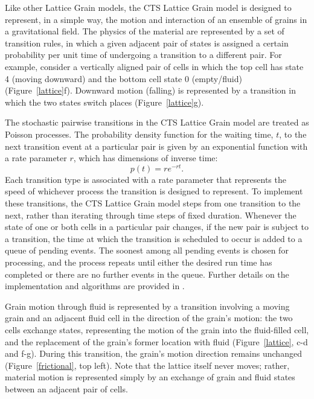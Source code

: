 \documentclass[esurf, manuscript]{copernicus}
\begin{document}
Like other Lattice Grain models, the CTS Lattice Grain model is designed to represent, in a simple way, the motion and interaction of an ensemble of grains in a gravitational field. The physics of the material are represented by a set of transition rules, in which a given adjacent pair of states is assigned a certain probability per unit time of undergoing a transition to a different pair. For example, consider a vertically aligned pair of cells in which the top cell has state 4 (moving downward) and the bottom cell state 0 (empty/fluid) (Figure~\ref{lattice}f). Downward motion (falling) is represented by a transition in which the two states switch places (Figure~\ref{lattice}g).

The stochastic pairwise transitions in the CTS Lattice Grain model are treated as Poisson processes. The probability density function for the waiting time, $t$, to the next transition event at a particular pair is given by an exponential function with a rate parameter $r$, which has dimensions of inverse time:
\begin{equation}
p(t) = r e^{-rt}.
\end{equation}
Each transition type is associated with a rate parameter that represents the speed of whichever process the transition is designed to represent. To implement these transitions, the CTS Lattice Grain model steps from one transition to the next, rather than iterating through time steps of fixed duration. Whenever the state of one or both cells in a particular pair changes, if the new pair is subject to a transition, the time at which the transition is scheduled to occur is added to a queue of pending events. The soonest among all pending events is chosen for processing, and the process repeats until either the desired run time has completed or there are no further events in the queue. Further details on the implementation and algorithms are provided in \citet{tucker2016celllab}.

Grain motion through fluid is represented by a transition involving a moving grain and an adjacent fluid cell in the direction of the grain's motion: the two cells exchange states, representing the motion of the grain into the fluid-filled cell, and the replacement of the grain's former location with fluid (Figure~\ref{lattice}, c-d and f-g). During this transition, the grain's motion direction remains unchanged (Figure~\ref{frictional}, top left). Note that the lattice itself never moves; rather, material motion is represented simply by an exchange of grain and fluid states between an adjacent pair of cells.
\end{document}
